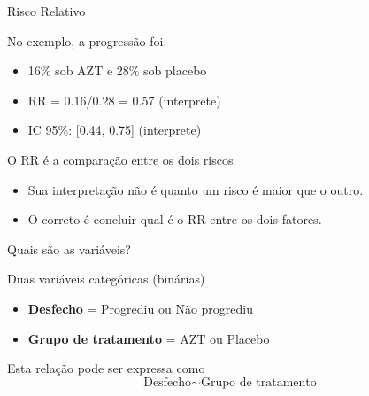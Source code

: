\documentclass{beamer}
\begin{document}
\begin{frame}{\scriptsize Risco Relativo}
  \begin{exampleblock}{No exemplo, a progressão foi:}
    \footnotesize
    \begin{itemize}
      \footnotesize
    \item 16\% sob AZT e 28\% sob placebo
    \item RR = 0.16/0.28 = 0.57 (interprete)
    \item IC 95\%: [0.44, 0.75] (interprete)
    \end{itemize}
  \end{exampleblock}
  \begin{block}{O RR é a comparação entre os dois riscos}
    \footnotesize
    \begin{itemize}
      \footnotesize
    \item Sua interpretação \alert{não é} quanto um risco é maior que o outro.
    \item O correto é concluir qual é o RR \alert{entre} os dois fatores.
    \end{itemize}
  \end{block}
\end{frame}

\begin{frame}{\scriptsize Quais são as variáveis?}

  \begin{block}{Duas variáveis categóricas (binárias)}
    \footnotesize
  \begin{itemize}
    \footnotesize
  \item {\bf Desfecho} = Progrediu ou Não progrediu
  \item {\bf Grupo de tratamento} = AZT ou Placebo
  \end{itemize}
  \end{block}
  \begin{block}{Esta relação pode ser expressa como}
    \footnotesize
    \begin{displaymath}
      \text{Desfecho} \sim \text{Grupo de tratamento}
    \end{displaymath}
  \end{block}
\end{frame}
\end{document}
